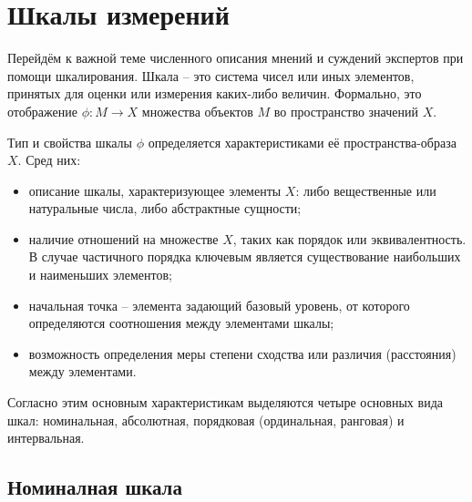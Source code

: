 \documentclass[a4paper,12pt]{extreport}
\newcommand{\Real}{\mathbb{R}}
\begin{document}


\section*{Шкалы измерений} %
\label{sec:_scales_}

Перейдём к важной теме численного описания мнений и суждений экспертов при помощи
шкалирования. Шкала -- это система чисел или иных элементов, принятых для оценки
или измерения каких-либо величин. Формально, это отображение $\phi:M\to X$ множества
объектов $M$ во пространство значений $X$.

Тип и свойства шкалы $\phi$ определяется характеристиками её пространства-образа $X$.
Сред них: \begin{itemize}
	\item описание шкалы, характеризующее элементы $X$: либо вещественные или натуральные
	числа, либо абстрактные сущности;
	\item наличие отношений на множестве $X$, таких как порядок или эквивалентность.
	В случае частичного порядка ключевым является существование наибольших и
	наименьших элементов;
	\item начальная точка -- элемента задающий базовый уровень, от которого
	определяются соотношения между элементами шкалы;
	\item возможность определения меры степени сходства или различия (расстояния)
	между элементами.
\end{itemize}

Согласно этим основным характеристикам выделяются четыре основных вида шкал: номинальная,
абсолютная, порядковая (ординальная, ранговая) и интервальная.

\subsection*{Номиналная шкала} %
\label{sub:nominal_scale}
\end{document}
